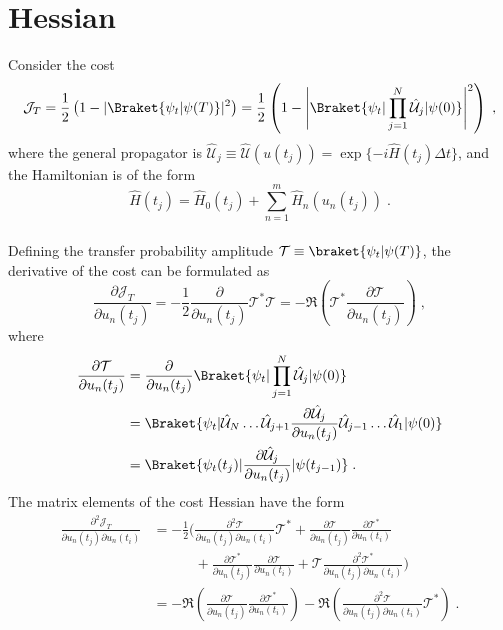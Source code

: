 \chapter{Hessian} \label{chap:Hessian}

Consider the cost
\begin{equation}
	\mathcal{J}_T = \frac{1}{2} \left( 1- |\Braket{\psi_t | \psi (T)}|^2 \right)  = \frac{1}{2} \left( 1- \Bigg|\Braket{\psi_t | \prod_{j = 1}^{N} \hat{\mathcal{U}}_j |\psi (0)} \Bigg| ^2 \right) \; ,
\end{equation}
where the general propagator is $\hat{\mathcal{U}}_j \equiv \hat{\mathcal{U}} (u(t_j)) = \exp \{ -i \hat{H} (t_j) \Delta t \}$, and the Hamiltonian is of the form
\begin{equation}
	\hat{H}(t_j) =  \hat{H}_0 (t_j) + \sum_{n = 1}^{m}  \hat{H}_n (u_n (t_j)) \; .
\end{equation}\\
Defining the transfer probability amplitude $\mathcal{T} \equiv \braket{\psi_t | \psi (T)}$, the derivative of the cost can be formulated as
\begin{equation}
	\frac{\partial \mathcal{J}_T}{\partial u_n (t_j)} = - \frac{1}{2} \frac{\partial}{\partial u_n (t_j)}  \mathcal{T}^* \mathcal{T}   = - \Re \left( \mathcal{T}^* \frac{\partial \mathcal{T}}{\partial u_n (t_j)} \right) \; ,
\end{equation}
where
\begin{align}
	\frac{\partial \mathcal{T}}{\partial u_n (t_j)} &= \frac{\partial }{\partial u_n (t_j)} \Braket{\psi_t | \prod_{j = 1}^{N} \hat{\mathcal{U}}_j | \psi (0)} \nonumber \\
	&= \Braket{\psi_t | \hat{\mathcal{U}}_N \ldots \hat{\mathcal{U}}_{j+1} \frac{\partial \hat{\mathcal{U}}_{j}}{\partial u_n (t_j)} \hat{\mathcal{U}}_{j-1} \ldots \hat{\mathcal{U}}_{1} | \psi (0)} \nonumber \\
	&= \Braket{\psi_t (t_j) |  \frac{\partial \hat{\mathcal{U}}_{j}}{\partial u_n (t_j)}  | \psi (t_{j-1})} \; .
	\label{eq:singleDerivT}
\end{align}
The matrix elements of the cost Hessian have the form
\begin{align}
	\frac{\partial^2 \mathcal{J}_T}{\partial u_n (t_j) \partial u_n (t_i)} &= - \frac{1}{2} \bigg( \frac{\partial^2 \mathcal{T}}{\partial u_n (t_j)   \partial u_n (t_i)} \mathcal{T}^* + \frac{\partial \mathcal{T}}{\partial u_n (t_j)} \frac{\partial \mathcal{T}^*}{\partial u_n (t_i)} \nonumber \\
	&\qquad \quad + \frac{\partial \mathcal{T}^*}{\partial u_n (t_j)} \frac{\partial \mathcal{T}}{\partial u_n (t_i)} + \mathcal{T} \frac{\partial^2 \mathcal{T}^*}{\partial u_n (t_j)   \partial u_n (t_i)} \bigg) \nonumber \\
	&= - \Re \left( \frac{\partial \mathcal{T}}{\partial u_n (t_j)} \frac{\partial \mathcal{T}^*}{\partial u_n (t_i)} \right) - \Re \left( \frac{\partial^2 \mathcal{T}}{\partial u_n (t_j)   \partial u_n (t_i)} \mathcal{T}^* \right) \; .
\end{align}

